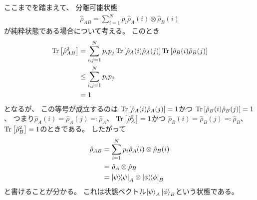 \documentclass[a4paper, 10pt]{jsarticle}
\begin{document}
ここまでを踏まえて、
分離可能状態
\begin{align}
	\hat{\rho}_{AB}
	= \sum_{i=1}^N p_i \hat{\rho}_A (i) \otimes \hat{\rho}_B (i)
\end{align}
が純粋状態である場合について考える。
このとき
\begin{align}
	\operatorname*{Tr} \left[ \hat{\rho}_{AB}^2 \right]
	&= \sum_{i,j = 1}^N p_i p_j
	\operatorname*{Tr} \left[ \hat{\rho}_A (i) \hat{\rho}_A (j) \right]
	\operatorname*{Tr} \left[ \hat{\rho}_B (i) \hat{\rho}_B (j) \right] \\
	&\leq \sum_{i, j = 1}^N p_i p_j \\
	&= 1
\end{align}
となるが、
この等号が成立するのは
$\operatorname*{Tr} \left[ \hat{\rho}_A (i) \hat{\rho}_A (j) \right] = 1$かつ
$\operatorname*{Tr} \left[ \hat{\rho}_B (i) \hat{\rho}_B (j) \right] = 1$、
つまり$\hat{\rho}_A (i) = \hat{\rho}_A (j) \eqqcolon \hat{\rho}_A$、
$\operatorname*{Tr} \left[ \hat{\rho}_A^2 \right] = 1$かつ
$\hat{\rho}_B (i) = \hat{\rho}_B (j) \eqqcolon \hat{\rho}_B$、
$\operatorname*{Tr} \left[ \hat{\rho}_B^2 \right] = 1$のときである。
したがって
\begin{align}
	\hat{\rho}_{AB}
	&= \sum_{i=1}^N p_i \hat{\rho}_A (i) \otimes \hat{\rho}_B (i) \\
	&= \hat{\rho}_A \otimes \hat{\rho}_B \\
	&= \Ket{\psi} \! \! \Bra{\psi}_A \otimes \Ket{\phi} \! \! \Bra{\phi}_B
\end{align}
と書けることが分かる。
これは状態ベクトル$\Ket{\psi}_A \Ket{\phi}_B$という状態である。
\end{document}
